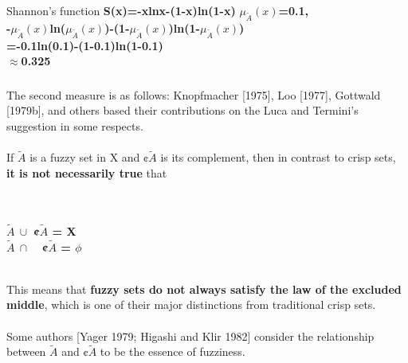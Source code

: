 \documentclass{beamer}
\begin{document}
\begin{CJK*}{UTF8}{bsmi}
\begin{frame}
\begin{block}{Shannon's function \textbf{S(x)=-xlnx-(1-x)ln(1-x)}}
\centering\textbf{$\mu_{\tilde{A}}(x)$=0.1,\\
-$\mu_{\tilde{A}}(x)$ln($\mu_{\tilde{A}}(x)$)-(1-$\mu_{\tilde{A}}(x)$)ln(1-$\mu_{\tilde{A}}(x)$)\\
=-0.1ln(0.1)-(1-0.1)ln(1-0.1)\\
$ \approx $0.325}\\
\end{block}
\end{frame}



\begin{frame}
\frametitle{}
The second measure is as follows: Knopfmacher [1975], Loo [1977], Gottwald [1979b], and others based their contributions on the Luca and Termini's suggestion in some respects.\\
~~\\
If $\tilde{A}$ is a fuzzy set in X and ¢$\tilde{A}$ is its complement, then in contrast to crisp sets, \textbf{it is not necessarily true} that\\
\begin{block}{}
~\\
~\\
\centering\textbf{$\tilde{A}~  \cup$  ¢$\tilde{A}$ = X}\\
\centering\textbf{$\tilde{A}~  \cap$~~¢$\tilde{A}$ = \(\phi\) }\\
~\\
\end{block}
This means that \textbf{fuzzy sets do not always satisfy the law of the excluded middle}, which is one of their major distinctions from traditional crisp sets. \\
~~\\
Some authors [Yager 1979; Higashi and Klir 1982] consider the relationship between $\tilde{A}$ and ¢$\tilde{A}$ to be the essence of fuzziness.
\end{frame}



\end{CJK*}
\end{document}
